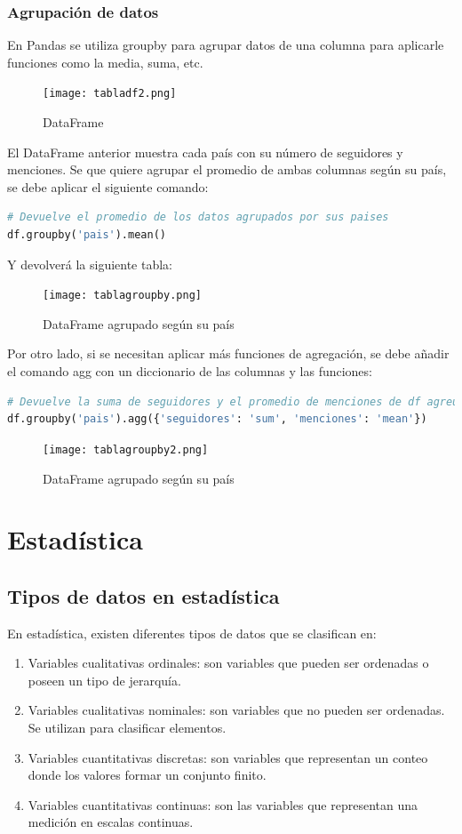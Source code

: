 \documentclass[a4paper, 12pt]{book}
\begin{document}
\subsubsection{Agrupación de datos}
En Pandas se utiliza groupby para agrupar datos de una columna para aplicarle funciones como la media, suma, etc.
\begin{figure}[H] 
	\centering 
	\texttt{[image: tabladf2.png]}
	\caption{DataFrame}
\end{figure}
El DataFrame anterior muestra cada país con su número de seguidores y menciones. Se que quiere agrupar el promedio de ambas columnas según su país, se debe aplicar el siguiente comando:
\begin{lstlisting}[language=Python]
# Devuelve el promedio de los datos agrupados por sus paises
df.groupby('pais').mean()
\end{lstlisting}
Y devolverá la siguiente tabla:
\begin{figure}[H] 
	\centering 
	\texttt{[image: tablagroupby.png]}
	\caption{DataFrame agrupado según su país}
\end{figure}
Por otro lado, si se necesitan aplicar más funciones de agregación, se debe añadir el comando agg con un diccionario de las columnas y las funciones:
\begin{lstlisting}[language=Python]
# Devuelve la suma de seguidores y el promedio de menciones de df agreupados por pais
df.groupby('pais').agg({'seguidores': 'sum', 'menciones': 'mean'})
\end{lstlisting}

\begin{figure}[H] 
	\centering 
	\texttt{[image: tablagroupby2.png]}
	\caption{DataFrame agrupado según su país}
\end{figure}

\section{Estadística}
\subsection{Tipos de datos en estadística}
En estadística, existen diferentes tipos de datos que se clasifican en:
\begin{enumerate}
	\item Variables cualitativas ordinales: son variables que pueden ser ordenadas o poseen un tipo de jerarquía.
	\item Variables cualitativas nominales: son variables que no pueden ser ordenadas. Se utilizan para clasificar elementos.
	\item Variables cuantitativas discretas: son variables que representan un conteo donde los valores formar un conjunto finito.
	\item Variables cuantitativas continuas: son las variables que representan una medición en escalas continuas.
\end{enumerate}
\end{document}
